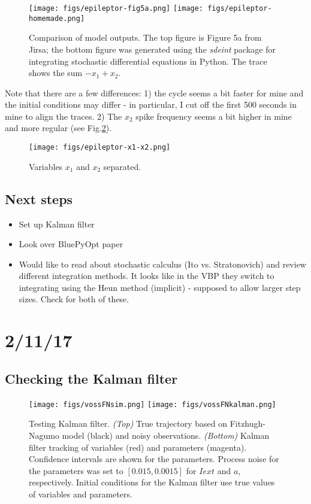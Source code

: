 \documentclass[11pt]{article}
\begin{document}
	\begin{figure}[htbp!]
		\centering
		\texttt{[image: figs/epileptor-fig5a.png]}
		\texttt{[image: figs/epileptor-homemade.png]}
		\caption{Comparison of model outputs. The top figure is Figure 5a from Jirsa; the bottom figure was generated using the \textit{sdeint} package for integrating stochastic differential equations in Python. The trace shows the sum $-x_1 + x_2$.}
		\label{fig:papercheck}
	\end{figure}

	Note that there are a few differences: 1) the cycle seems a bit faster for mine and the initial conditions may differ - in particular, I cut off the first 500 seconds in mine to align the traces. 2) The $x_2$ spike frequency seems a bit higher in mine and more regular (see Fig.\ref{fig:sepx1x2}).

	\begin{figure}[htbp!]
		\centering
		\texttt{[image: figs/epileptor-x1-x2.png]}
		\caption{Variables $x_1$ and $x_2$ separated.}
		\label{fig:sepx1x2}
	\end{figure}

	\subsection{Next steps}
	\begin{itemize}
		\item Set up Kalman filter
		\item Look over BluePyOpt paper \cite{Van-Geit:2016aa}
		\item Would like to read about stochastic calculus (Ito vs. Stratonovich) and review different integration methods. It looks like in the VBP they switch to integrating using the Heun method (implicit) - supposed to allow larger step sizes. Check \cite{Kloeden:1995aa} for both of these. 
	\end{itemize}

\section{2/11/17}
		\subsection{Checking the Kalman filter} %
			\label{sub:check_kalman_filter}

			\begin{figure}[htbp!]
			\texttt{[image: figs/vossFNsim.png]}
			\texttt{[image: figs/vossFNkalman.png]}
			\caption{Testing Kalman filter. \textit{(Top)} True trajectory based on Fitzhugh-Nagumo model (black) and noisy observations. \textit{(Bottom)} Kalman filter tracking of variables (red) and parameters (magenta). Confidence intervals are shown for the parameters. Process noise for the parameters was set to $[0.015, 0.0015]$ for $Iext$ and $a$, respectively. Initial conditions for the Kalman filter use true values of variables and parameters. }
			\label{fig:kalmantestFN}
			\end{figure}
\end{document}
